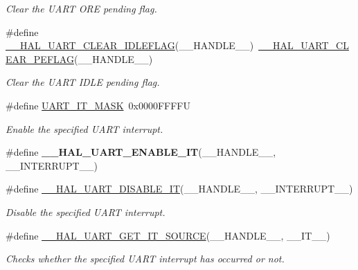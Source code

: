 \begin{DoxyCompactItemize}
\begin{DoxyCompactList}\small\item\em Clear the U\+A\+RT O\+RE pending flag. \end{DoxyCompactList}\item 
\#define \mbox{\hyperlink{group___u_a_r_t___exported___macros_ga1345aa0af53d82269b13835c225e91d0}{\+\_\+\+\_\+\+H\+A\+L\+\_\+\+U\+A\+R\+T\+\_\+\+C\+L\+E\+A\+R\+\_\+\+I\+D\+L\+E\+F\+L\+AG}}(\+\_\+\+\_\+\+H\+A\+N\+D\+L\+E\+\_\+\+\_\+)~\mbox{\hyperlink{group___u_a_r_t___exported___macros_gaba5e19c60e0f37341b1585a380b84d49}{\+\_\+\+\_\+\+H\+A\+L\+\_\+\+U\+A\+R\+T\+\_\+\+C\+L\+E\+A\+R\+\_\+\+P\+E\+F\+L\+AG}}(\+\_\+\+\_\+\+H\+A\+N\+D\+L\+E\+\_\+\+\_\+)
\begin{DoxyCompactList}\small\item\em Clear the U\+A\+RT I\+D\+LE pending flag. \end{DoxyCompactList}\item 
\#define \mbox{\hyperlink{group___u_a_r_t___exported___macros_ga869439269c26e8dee93d49b1c7e67448}{U\+A\+R\+T\+\_\+\+I\+T\+\_\+\+M\+A\+SK}}~0x0000\+F\+F\+F\+FU
\begin{DoxyCompactList}\small\item\em Enable the specified U\+A\+RT interrupt. \end{DoxyCompactList}\item 
\#define {\bfseries \+\_\+\+\_\+\+H\+A\+L\+\_\+\+U\+A\+R\+T\+\_\+\+E\+N\+A\+B\+L\+E\+\_\+\+IT}(\+\_\+\+\_\+\+H\+A\+N\+D\+L\+E\+\_\+\+\_\+,  \+\_\+\+\_\+\+I\+N\+T\+E\+R\+R\+U\+P\+T\+\_\+\+\_\+)
\item 
\#define \mbox{\hyperlink{group___u_a_r_t___exported___macros_ga3c29b33f38658acbf592e9aaf84c6f33}{\+\_\+\+\_\+\+H\+A\+L\+\_\+\+U\+A\+R\+T\+\_\+\+D\+I\+S\+A\+B\+L\+E\+\_\+\+IT}}(\+\_\+\+\_\+\+H\+A\+N\+D\+L\+E\+\_\+\+\_\+,  \+\_\+\+\_\+\+I\+N\+T\+E\+R\+R\+U\+P\+T\+\_\+\+\_\+)
\begin{DoxyCompactList}\small\item\em Disable the specified U\+A\+RT interrupt. \end{DoxyCompactList}\item 
\#define \mbox{\hyperlink{group___u_a_r_t___exported___macros_gab7ad503802bf56bf397c392fc8e18b77}{\+\_\+\+\_\+\+H\+A\+L\+\_\+\+U\+A\+R\+T\+\_\+\+G\+E\+T\+\_\+\+I\+T\+\_\+\+S\+O\+U\+R\+CE}}(\+\_\+\+\_\+\+H\+A\+N\+D\+L\+E\+\_\+\+\_\+,  \+\_\+\+\_\+\+I\+T\+\_\+\+\_\+)
\begin{DoxyCompactList}\small\item\em Checks whether the specified U\+A\+RT interrupt has occurred or not. \end{DoxyCompactList}\item 

\end{DoxyCompactItemize}
